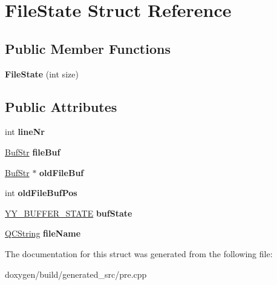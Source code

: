\hypertarget{struct_file_state}{}\section{File\+State Struct Reference}
\label{struct_file_state}
\subsection*{Public Member Functions}
\begin{DoxyCompactItemize}
\item 
\mbox{\label{struct_file_state_a23db38e601c430bd31e12f61b3cbb5d2}} 
{\bfseries File\+State} (int size)
\end{DoxyCompactItemize}
\subsection*{Public Attributes}
\begin{DoxyCompactItemize}
\item 
\mbox{\label{struct_file_state_a249445ca799ace1fa1ba438369273e04}} 
int {\bfseries line\+Nr}
\item 
\mbox{\label{struct_file_state_ad3bde327c92032a6ea108d5b6b82cb0f}} 
\mbox{\hyperlink{class_buf_str}{Buf\+Str}} {\bfseries file\+Buf}
\item 
\mbox{\label{struct_file_state_a1f4e8240ac9abda5299998f9db17f96a}} 
\mbox{\hyperlink{class_buf_str}{Buf\+Str}} $\ast$ {\bfseries old\+File\+Buf}
\item 
\mbox{\label{struct_file_state_adcbdee9d4290766ae74a8d79115040b6}} 
int {\bfseries old\+File\+Buf\+Pos}
\item 
\mbox{\label{struct_file_state_a1b18cdf1dfc9a5d436c69bb18062bc19}} 
\mbox{\hyperlink{structyy__buffer__state}{Y\+Y\+\_\+\+B\+U\+F\+F\+E\+R\+\_\+\+S\+T\+A\+TE}} {\bfseries buf\+State}
\item 
\mbox{\label{struct_file_state_a3854d7f199d9ca0a7ca88d6cc2add008}} 
\mbox{\hyperlink{class_q_c_string}{Q\+C\+String}} {\bfseries file\+Name}
\end{DoxyCompactItemize}


The documentation for this struct was generated from the following file\+:\begin{DoxyCompactItemize}
\item 
doxygen/build/generated\+\_\+src/pre.\+cpp\end{DoxyCompactItemize}
